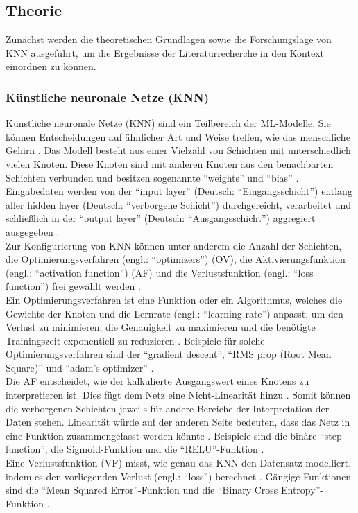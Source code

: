 \documentclass{scrartcl}
\begin{document}
\subsection{Theorie}

Zunächst werden die theoretischen Grundlagen sowie die Forschungslage 
von KNN ausgeführt, um die Ergebnisse der Literaturrecherche in den 
Kontext einordnen zu können.

\subsubsection{Künstliche neuronale Netze (KNN)}
Künstliche neuronale Netze (KNN) sind ein Teilbereich der ML-Modelle. Sie können
Entscheidungen auf ähnlicher Art und Weise treffen, wie das menschliche Gehirn \cite{ibm}.
Das Modell besteht aus einer Vielzahl von Schichten mit unterschiedlich vielen
Knoten. Diese Knoten sind mit anderen Knoten aus den benachbarten Schichten verbunden
und besitzen sogenannte \enquote{weights} und \enquote{bias} \cite{ibm}.
Eingabedaten werden von der \enquote{input layer} (Deutsch: \enquote{Eingangsschicht})
entlang aller hidden layer (Deutsch: \enquote{verborgene Schicht}) durchgereicht,
verarbeitet und schließlich in der \enquote{output layer}
(Deutsch: \enquote{Ausgangsschicht}) aggregiert ausgegeben \cite{ibm}.
\medskip \\
Zur Konfigurierung von KNN können unter anderem die Anzahl der Schichten,
die Optimierungsverfahren (engl.: \enquote{optimizers}) (OV), die
Aktivierungsfunktion (engl.: \enquote{activation function}) (AF) und die
Verlustsfunktion (engl.: \enquote{loss function}) frei gewählt werden
\cite{actopt}.
\medskip \\
Ein Optimierungsverfahren ist eine Funktion oder ein Algorithmus, welches
die Gewichte der Knoten und die Lernrate (engl.: \enquote{learning rate})
anpasst, um den Verlust zu minimieren, die Genauigkeit zu maximieren und
die benötigte Trainingszeit exponentiell zu reduzieren \cite{actopt}.
Beispiele für solche Optimierungsverfahren sind der \enquote{gradient descent},
\enquote{RMS prop (Root Mean Square)} und \enquote{adam's optimizer} \cite{actopt}.
\smallskip \\
Die AF entscheidet, wie der kalkulierte Ausgangswert
eines Knotens zu interpretieren ist. Dies fügt dem Netz eine Nicht-Linearität
hinzu \cite{actopt}. Somit können die verborgenen Schichten jeweils für
andere Bereiche der Interpretation der Daten stehen. Linearität würde auf
der anderen Seite bedeuten, dass das Netz in eine Funktion zusammengefasst
werden könnte \cite{actopt}. Beispiele sind die binäre \enquote{step function},
die Sigmoid-Funktion und die \enquote{RELU}-Funktion \cite{actopt}.
\smallskip \\
Eine Verlustsfunktion (VF) misst, wie genau das KNN den Datensatz modelliert, indem
es den vorliegenden Verlust (engl.: \enquote{loss}) berechnet \cite{actopt}.
Gängige Funktionen sind die \enquote{Mean Squared Error}-Funktion und die
\enquote{Binary Cross Entropy}-Funktion \cite{actopt}.
\end{document}
